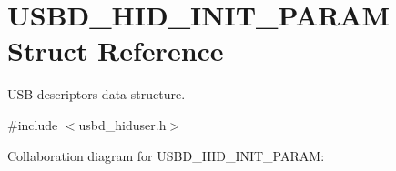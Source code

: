 \hypertarget{struct_u_s_b_d___h_i_d___i_n_i_t___p_a_r_a_m}{}\section{U\+S\+B\+D\+\_\+\+H\+I\+D\+\_\+\+I\+N\+I\+T\+\_\+\+P\+A\+R\+AM Struct Reference}
\label{struct_u_s_b_d___h_i_d___i_n_i_t___p_a_r_a_m}


U\+SB descriptors data structure.  




{\ttfamily \#include $<$usbd\+\_\+hiduser.\+h$>$}



Collaboration diagram for U\+S\+B\+D\+\_\+\+H\+I\+D\+\_\+\+I\+N\+I\+T\+\_\+\+P\+A\+R\+AM\+:
